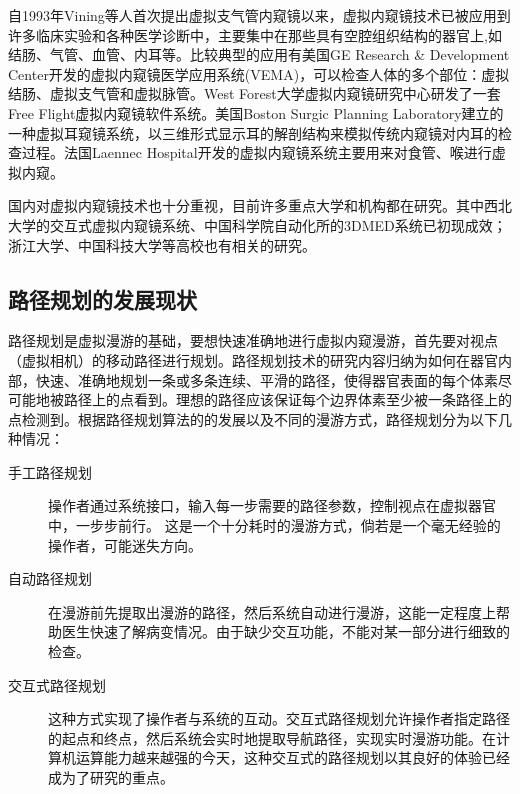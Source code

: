 自1993年Vining等人首次提出虚拟支气管内窥镜以来，虚拟内窥镜技术已被应用到许多临床实验和各种医学诊断中，主要集中在那些具有空腔组织结构的器官上,如结肠、气管、血管、内耳等。比较典型的应用有美国GE Research \& Development Center开发的虚拟内窥镜医学应用系统(VEMA)，可以检查人体的多个部位：虚拟结肠、虚拟支气管和虚拟脉管。West Forest大学虚拟内窥镜研究中心研发了一套Free Flight虚拟内窥镜软件系统。美国Boston Surgic Planning Laboratory建立的一种虚拟耳窥镜系统，以三维形式显示耳的解剖结构来模拟传统内窥镜对内耳的检查过程。法国Laennec Hospital开发的虚拟内窥镜系统主要用来对食管、喉进行虚拟内窥。

国内对虚拟内窥镜技术也十分重视，目前许多重点大学和机构都在研究。其中西北大学的交互式虚拟内窥镜系统、中国科学院自动化所的3DMED系统已初现成效；浙江大学、中国科技大学等高校也有相关的研究。

\subsection{路径规划的发展现状}
路径规划是虚拟漫游的基础，要想快速准确地进行虚拟内窥漫游，首先要对视点（虚拟相机）的移动路径进行规划。路径规划技术的研究内容归纳为如何在器官内部，快速、准确地规划一条或多条连续、平滑的路径，使得器官表面的每个体素尽可能地被路径上的点看到。理想的路径应该保证每个边界体素至少被一条路径上的点检测到。根据路径规划算法的的发展以及不同的漫游方式，路径规划分为以下几种情况：
\begin{description}
    \item[手工路径规划] 操作者通过系统接口，输入每一步需要的路径参数，控制视点在虚拟器官中，一步步前行。 这是一个十分耗时的漫游方式，倘若是一个毫无经验的操作者，可能迷失方向。
　　\item[自动路径规划] 在漫游前先提取出漫游的路径，然后系统自动进行漫游，这能一定程度上帮助医生快速了解病变情况。由于缺少交互功能，不能对某一部分进行细致的检查。
　　\item[交互式路径规划] 这种方式实现了操作者与系统的互动。交互式路径规划允许操作者指定路径的起点和终点，然后系统会实时地提取导航路径，实现实时漫游功能。在计算机运算能力越来越强的今天，这种交互式的路径规划以其良好的体验已经成为了研究的重点。
\end{description}

